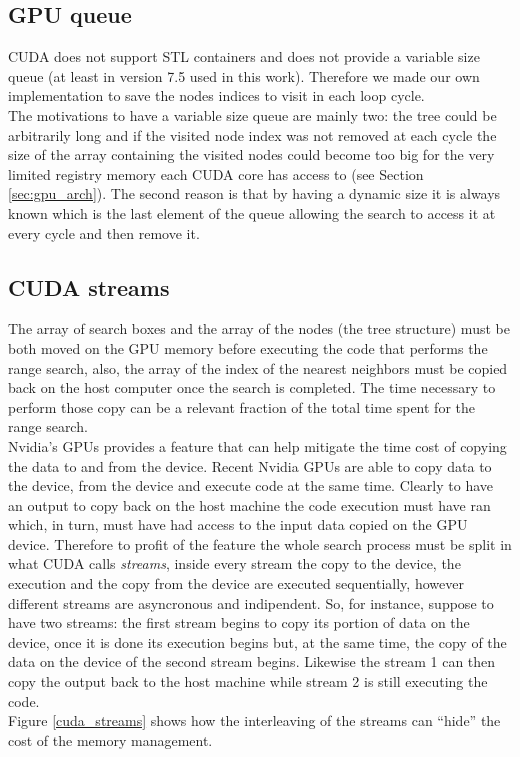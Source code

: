 \subsection{GPU queue}
CUDA does not support STL containers and does not provide a variable size queue (at least in version 7.5 used in this work). Therefore we made our own implementation to save the nodes indices to visit in each loop cycle.\\
The motivations to have a variable size queue are mainly two: the tree could be arbitrarily long and if the visited node index was not removed at each cycle the size of the array containing the visited nodes could become too big for the very limited registry memory each CUDA core has access to (see Section \ref{sec:gpu_arch}). The second reason is that by having a dynamic size it is always known which is the last element of the queue allowing the search to access it at every cycle and then remove it.\\

\subsection{CUDA streams}
The array of search boxes and the array of the nodes (the tree structure) must be both moved on the GPU memory before executing the code that performs the range search, also, the array of the index of the nearest neighbors must be copied back on the host computer once the search is completed. The time necessary to perform those copy can be a relevant fraction of the total time spent for the range search.\\
Nvidia's GPUs provides a feature that can help mitigate the time cost of copying the data to and from the device. Recent Nvidia GPUs are able to copy data to the device, from the device and execute code at the same time. Clearly to have an output to copy back on the host machine the code execution must have ran which, in turn, must have had access to the input data copied on the GPU device. Therefore to profit of the feature the whole search process must be split in what CUDA calls \textit{streams}, inside every stream the copy to the device, the execution and the copy from the device are executed sequentially, however different streams are asyncronous and indipendent. So, for instance, suppose to have two streams: the first stream begins to copy its portion of data on the device, once it is done its execution begins but, at the same time, the copy of the data on the device of the second stream begins. Likewise the stream 1 can then copy the output back to the host machine while stream 2 is still executing the code.\\
Figure \ref{cuda_streams} shows how the interleaving of the streams can ``hide'' the cost of the memory management.\\

